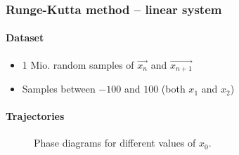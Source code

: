 \begin{frame}
	\frametitle{Runge-Kutta method -- linear system}
	\paragraph{Dataset}\vspace{-2mm}
	\begin{itemize}
		\item 1 Mio. random samples of $\overrightarrow{x_{n}}$ and $\overrightarrow{x_{n+1}}$
		\item Samples between $-100$ and $100$ (both $x_1$ and $x_2$)
	\end{itemize}
	\paragraph{Trajectories}\vspace{-2mm}
	\begin{figure}[H]
		\quad
		\quad
		\caption{Phase diagrams for different values of $x_0$.}
	\end{figure}
\end{frame}

